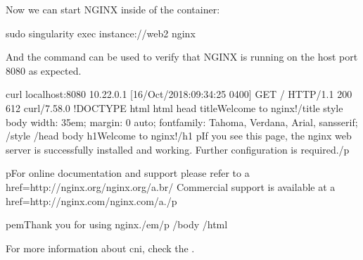 \documentclass[letterpaper,10pt,english]{sphinxmanual}
\begin{document}
Now we can start NGINX inside of the container:

%
\begin{sphinxVerbatim}[commandchars=\\\{\}]
\PYGZdl{} sudo singularity exec instance://web2 nginx
\end{sphinxVerbatim}

And the  command can be used to verify that NGINX is running on the host
port 8080 as expected.

%
\begin{sphinxVerbatim}[commandchars=\\\{\}]
\PYGZdl{} curl localhost:8080
10.22.0.1 \PYGZhy{} \PYGZhy{} [16/Oct/2018:09:34:25 \PYGZhy{}0400] \PYGZdq{}GET / HTTP/1.1\PYGZdq{} 200 612 \PYGZdq{}\PYGZhy{}\PYGZdq{} \PYGZdq{}curl/7.58.0\PYGZdq{} \PYGZdq{}\PYGZhy{}\PYGZdq{}
\PYGZlt{}!DOCTYPE html\PYGZgt{}
\PYGZlt{}html\PYGZgt{}
\PYGZlt{}head\PYGZgt{}
\PYGZlt{}title\PYGZgt{}Welcome to nginx!\PYGZlt{}/title\PYGZgt{}
\PYGZlt{}style\PYGZgt{}
    body \PYGZob{}
        width: 35em;
        margin: 0 auto;
        font\PYGZhy{}family: Tahoma, Verdana, Arial, sans\PYGZhy{}serif;
    \PYGZcb{}
\PYGZlt{}/style\PYGZgt{}
\PYGZlt{}/head\PYGZgt{}
\PYGZlt{}body\PYGZgt{}
\PYGZlt{}h1\PYGZgt{}Welcome to nginx!\PYGZlt{}/h1\PYGZgt{}
\PYGZlt{}p\PYGZgt{}If you see this page, the nginx web server is successfully installed and
working. Further configuration is required.\PYGZlt{}/p\PYGZgt{}

\PYGZlt{}p\PYGZgt{}For online documentation and support please refer to
\PYGZlt{}a href=\PYGZdq{}http://nginx.org/\PYGZdq{}\PYGZgt{}nginx.org\PYGZlt{}/a\PYGZgt{}.\PYGZlt{}br/\PYGZgt{}
Commercial support is available at
\PYGZlt{}a href=\PYGZdq{}http://nginx.com/\PYGZdq{}\PYGZgt{}nginx.com\PYGZlt{}/a\PYGZgt{}.\PYGZlt{}/p\PYGZgt{}

\PYGZlt{}p\PYGZgt{}\PYGZlt{}em\PYGZgt{}Thank you for using nginx.\PYGZlt{}/em\PYGZgt{}\PYGZlt{}/p\PYGZgt{}
\PYGZlt{}/body\PYGZgt{}
\PYGZlt{}/html\PYGZgt{}
\end{sphinxVerbatim}

For more information about cni, check the
.



\renewcommand{\indexname}{Index}
\printindex
\end{document}
